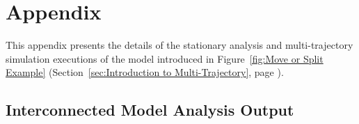 \chapter{Appendix}
\label{A. Appendix}

This appendix presents the details of the stationary analysis and multi-trajectory simulation executions of the model introduced in Figure~\ref{fig:Move or Split Example} (Section~\ref{sec:Introduction to Multi-Trajectory}, page \pageref{fig:Move or Split Example}). 


\section*{Interconnected Model Analysis Output}

